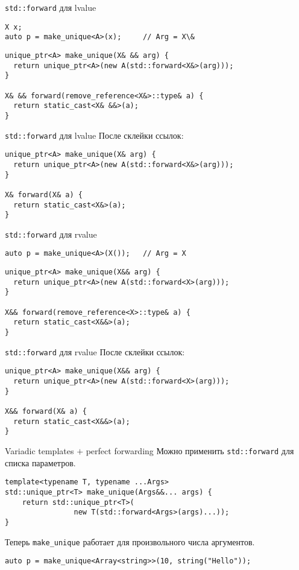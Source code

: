 \documentclass{beamer}
\begin{document}
\begin{frame}[fragile]{\texttt{std::forward} для lvalue}
\begin{lstlisting}
X x;
auto p = make_unique<A>(x); 	// Arg = X\&
\end{lstlisting}

\begin{lstlisting}
unique_ptr<A> make_unique(X& && arg) { 
  return unique_ptr<A>(new A(std::forward<X&>(arg)));
} 

X& && forward(remove_reference<X&>::type& a) {
  return static_cast<X& &&>(a);
} 
\end{lstlisting}
\end{frame}

\begin{frame}[fragile]{\texttt{std::forward} для lvalue}
После склейки ссылок:
\begin{lstlisting}
unique_ptr<A> make_unique(X& arg) { 
  return unique_ptr<A>(new A(std::forward<X&>(arg)));
} 

X& forward(X& a) {
  return static_cast<X&>(a);
} 
\end{lstlisting}
\end{frame}

\begin{frame}[fragile]{\texttt{std::forward} для rvalue}
\begin{lstlisting}
auto p = make_unique<A>(X());	// Arg = X
\end{lstlisting}

\begin{lstlisting}
unique_ptr<A> make_unique(X&& arg) { 
  return unique_ptr<A>(new A(std::forward<X>(arg)));
} 

X&& forward(remove_reference<X>::type& a) {
  return static_cast<X&&>(a);
} 
\end{lstlisting}
\end{frame}

\begin{frame}[fragile]{\texttt{std::forward} для rvalue}
После склейки ссылок:
\begin{lstlisting}
unique_ptr<A> make_unique(X&& arg) { 
  return unique_ptr<A>(new A(std::forward<X>(arg)));
} 

X&& forward(X& a) {
  return static_cast<X&&>(a);
} 
\end{lstlisting}

\end{frame}

\begin{frame}[fragile]{Variadic templates $+$ perfect forwarding}
Можно применить \texttt{std::forward} для списка параметров.
\begin{lstlisting}
template<typename T, typename ...Args> 
std::unique_ptr<T> make_unique(Args&&... args) {
    return std::unique_ptr<T>(
                new T(std::forward<Args>(args)...));
}
\end{lstlisting}
Теперь \texttt{make\_unique} работает для произвольного числа аргументов.
\begin{lstlisting}
auto p = make_unique<Array<string>>(10, string("Hello"));
\end{lstlisting}
\end{frame}
\end{document}
